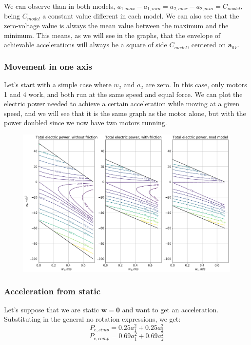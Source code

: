 \documentclass[12pt]{article}
\renewcommand{\vec}[1]{\bm{#1}}
\begin{document}
We can observe than in both models, $a_{1,max} - a_{1,min} = a_{2,max} - a_{2,min} = C_{model}$, being $C_{model}$ a constant value different in each model. We can also see that the zero-voltage value is always the mean value between the maximum and the minimum. This means, as we will see in the graphs, that the envelope of achievable accelerations will always be a square of side $C_{model}$, centered on $\vec a_{0V}$.
\subsubsection*{Movement in one axis}
Let's start with a simple case where $w_2$ and $a_2$ are zero. In this case, only motors 1 and 4 work, and both run at the same speed and equal force. We can plot the electric power needed to achieve a certain acceleration while moving at a given speed, and we will see that it is the same graph as the motor alone, but with the power doubled since we now have two motors running.

\begin{figure}[h]
	\centering
	\includegraphics[width=.8\linewidth]{total_electric_power_w_and_wout_fricc}
	\label{fig:power_f_a1_w1}
\end{figure}

\subsubsection*{Acceleration from static}
Let's suppose that we are static $\vec{w} = \vec{0}$ and want to get an acceleration. Substituting in the general no rotation expressions, we get:
$$P_{e, simp} = 0.25 a_{1}^{2} + 0.25 a_{2}^{2}$$
$$P_{e, comp} = 0.69 a_{1}^{2} + 0.69 a_{2}^{2}$$
\end{document}
